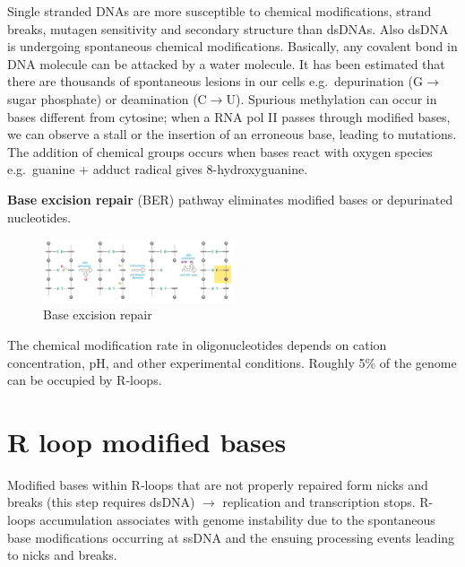 Single stranded DNAs are more susceptible to chemical modifications, strand breaks, mutagen sensitivity and secondary structure than dsDNAs. Also dsDNA is undergoing spontaneous chemical modifications. Basically, any covalent bond in DNA molecule can be attacked by a water molecule. It has been estimated that there are thousands of spontaneous lesions in our cells e.g.~depurination (G$\rightarrow$sugar phosphate) or deamination (C$\rightarrow$U). Spurious methylation can occur in bases different from cytosine; when a RNA pol II passes through modified bases, we can observe a stall or the insertion of an erroneous base, leading to mutations. The addition of chemical groups occurs when bases react with oxygen species e.g.~guanine + adduct radical gives 8-hydroxyguanine.

\textbf{Base excision repair} (BER) pathway eliminates modified bases or depurinated nucleotides.

\begin{figure}
\centering
\includegraphics[width=0.5\textwidth]{../_resources/Screen_Shot_2022-11-30_at_08-49-05.png}
\caption{Base excision repair}
\end{figure}

The chemical modification rate in oligonucleotides depends on cation concentration, pH, and other experimental conditions. Roughly 5\% of the genome can be occupied by R-loops.

\hypertarget{r-loop-modified-bases}{%
\section{R loop modified bases}\label{r-loop-modified-bases}}

Modified bases within R-loops that are not properly repaired form nicks and breaks (this step requires dsDNA) $\rightarrow$ replication and transcription stops. R-loops accumulation associates with genome instability due to the spontaneous base modifications occurring at ssDNA and the ensuing processing events leading to nicks and breaks.

